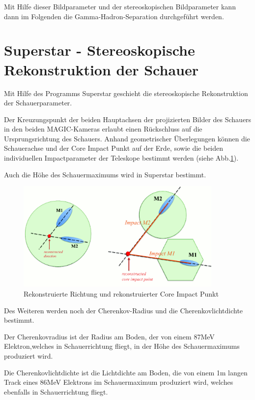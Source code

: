 Mit Hilfe dieser Bildparameter und der stereoskopischen Bildparameter kann dann im Folgenden die Gamma-Hadron-Separation durchgeführt werden.


\section{Superstar - Stereoskopische Rekonstruktion der Schauer}
Mit Hilfe des Programms Superstar geschieht die stereoskopische Rekonstruktion der Schauerparameter.

Der Kreuzungspunkt der beiden Hauptachsen der projizierten Bilder des Schauers in den beiden MAGIC-Kameras erlaubt einen Rückschluss auf die Ursprungsrichtung des Schauers.
Anhand geometrischer Überlegungen können die Schauerachse und der Core Impact Punkt auf der Erde, sowie die beiden individuellen Impactparameter der Teleskope bestimmt werden (siehe Abb.\ref{Superstar}).

Auch die Höhe des Schauermaximums wird in Superstar bestimmt.

\begin{figure}
    \centering
    \includegraphics[width=0.9\textwidth]{./Plots/03_MonteCarlos/Superstar.png}
    \caption{Rekonstruierte Richtung und rekonstruierter Core Impact Punkt}
    \label{Superstar}
\end{figure}

Des Weiteren werden noch der Cherenkov-Radius und die Cherenkovlichtdichte bestimmt.

Der Cherenkovradius ist der Radius am Boden, der von einem 87MeV Elektron,welches in Schauerrichtung fliegt, in der Höhe des Schauermaximums produziert wird.

Die Cherenkovlichtdichte ist die Lichtdichte am Boden, die von einem 1m langen Track eines 86MeV Elektrons im Schauermaximum produziert wird, welches ebenfalls in Schauerrichtung fliegt.



